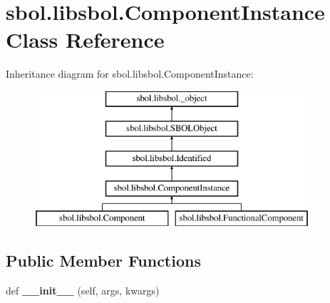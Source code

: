 \hypertarget{classsbol_1_1libsbol_1_1_component_instance}{}\section{sbol.\+libsbol.\+Component\+Instance Class Reference}
\label{classsbol_1_1libsbol_1_1_component_instance}
Inheritance diagram for sbol.\+libsbol.\+Component\+Instance\+:\begin{figure}[H]
\begin{center}
\leavevmode
\includegraphics[height=5.000000cm]{classsbol_1_1libsbol_1_1_component_instance}
\end{center}
\end{figure}
\subsection*{Public Member Functions}
\begin{DoxyCompactItemize}
\item 
def {\bfseries \+\_\+\+\_\+init\+\_\+\+\_\+} (self, args, kwargs)\hypertarget{classsbol_1_1libsbol_1_1_component_instance_a2e066b48e3eb405d5ea06ff695381096}{}\label{classsbol_1_1libsbol_1_1_component_instance_a2e066b48e3eb405d5ea06ff695381096}

\end{DoxyCompactItemize}
